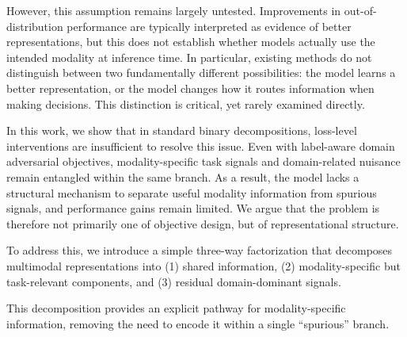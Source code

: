 \documentclass{article}
\begin{document}
However, this assumption remains largely untested. Improvements in out-of-distribution performance are typically interpreted as evidence of better representations, but this does not establish whether models actually use the intended modality at inference time. In particular, existing methods do not distinguish between two fundamentally different possibilities: the model learns a better representation, or the model changes how it routes information when making decisions. This distinction is critical, yet rarely examined directly.

In this work, we show that in standard binary decompositions, loss-level interventions are insufficient to resolve this issue. Even with label-aware domain adversarial objectives, modality-specific task signals and domain-related nuisance remain entangled within the same branch. As a result, the model lacks a structural mechanism to separate useful modality information from spurious signals, and performance gains remain limited.
We argue that the problem is therefore not primarily one of objective design, but of representational structure.

To address this, we introduce a simple three-way factorization that decomposes multimodal representations into (1) shared information, (2) modality-specific but task-relevant components, and  (3) residual domain-dominant signals.

This decomposition provides an explicit pathway for modality-specific information, removing the need to encode it within a single ``spurious'' branch.
\end{document}

